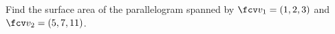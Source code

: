 \begin{frame}
\begin{example}
Find the surface area of the parallelogram spanned by $\fcv v_1 = (1,2,3)$ and $\fcv v_2=(5,7,11)$.
\end{example}
\end{frame}